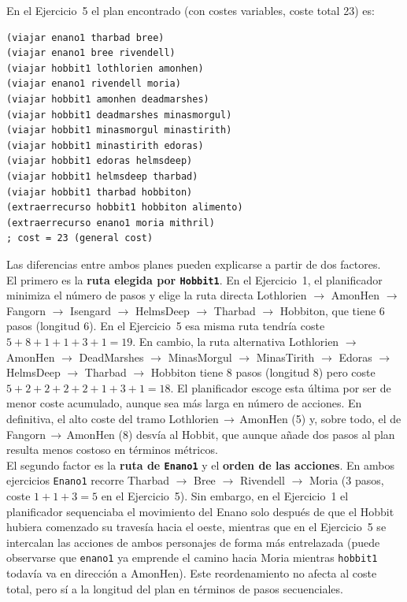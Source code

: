 \documentclass[10pt]{article}
\begin{document}
En el Ejercicio~5 el plan encontrado (con costes variables, coste total 23) es:
 
\begin{lstlisting}
(viajar enano1 tharbad bree)
(viajar enano1 bree rivendell)
(viajar hobbit1 lothlorien amonhen)
(viajar enano1 rivendell moria)
(viajar hobbit1 amonhen deadmarshes)
(viajar hobbit1 deadmarshes minasmorgul)
(viajar hobbit1 minasmorgul minastirith)
(viajar hobbit1 minastirith edoras)
(viajar hobbit1 edoras helmsdeep)
(viajar hobbit1 helmsdeep tharbad)
(viajar hobbit1 tharbad hobbiton)
(extraerrecurso hobbit1 hobbiton alimento)
(extraerrecurso enano1 moria mithril)
; cost = 23 (general cost)
\end{lstlisting}
 
Las diferencias entre ambos planes pueden explicarse a partir de dos factores.\\
 
El primero es la \textbf{ruta elegida por \texttt{Hobbit1}}. En el Ejercicio~1, el planificador minimiza el número de pasos y elige la ruta directa Lothlorien $\to$ AmonHen $\to$ Fangorn $\to$ Isengard $\to$ HelmsDeep $\to$ Tharbad $\to$ Hobbiton, que tiene 6 pasos (longitud 6). En el Ejercicio~5 esa misma ruta tendría coste $5 + 8 + 1 + 1 + 3 + 1 = 19$. En cambio, la ruta alternativa Lothlorien $\to$ AmonHen $\to$ DeadMarshes $\to$ MinasMorgul $\to$ MinasTirith $\to$ Edoras $\to$ HelmsDeep $\to$ Tharbad $\to$ Hobbiton tiene 8 pasos (longitud 8) pero coste $5 + 2 + 2 + 2 + 2 + 1 + 3 + 1 = 18$. El planificador escoge esta última por ser de menor coste acumulado, aunque sea más larga en número de acciones. En definitiva, el alto coste del tramo Lothlorien\,$\to$\,AmonHen (5) y, sobre todo, el de Fangorn\,$\to$\,AmonHen (8) desvía al Hobbit, que aunque añade dos pasos al plan resulta menos costoso en términos métricos.\\
 
El segundo factor es la \textbf{ruta de \texttt{Enano1}} y el \textbf{orden de las acciones}. En ambos ejercicios \texttt{Enano1} recorre Tharbad $\to$ Bree $\to$ Rivendell $\to$ Moria (3 pasos, coste $1+1+3=5$ en el Ejercicio~5). Sin embargo, en el Ejercicio~1 el planificador sequenciaba el movimiento del Enano solo después de que el Hobbit hubiera comenzado su travesía hacia el oeste, mientras que en el Ejercicio~5 se intercalan las acciones de ambos personajes de forma más entrelazada (puede observarse que \texttt{enano1} ya emprende el camino hacia Moria mientras \texttt{hobbit1} todavía va en dirección a AmonHen). Este reordenamiento no afecta al coste total, pero sí a la longitud del plan en términos de pasos secuenciales.\\
 
\end{document}
